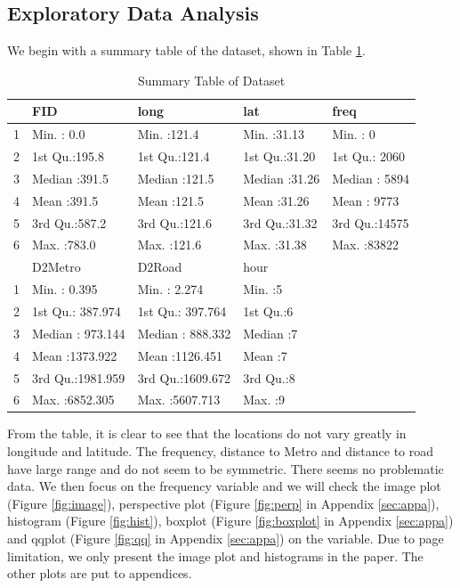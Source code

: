 \documentclass[hidelinks,12pt]{article}
\begin{document}
	\subsection{Exploratory Data Analysis}\label{sec:reseda}
	We begin with a summary table of the dataset, shown in Table \ref{tbl:sumdata}.
	\begin{table}[ht]
		\centering
		\caption{Summary Table of Dataset \label{tbl:sumdata}}
		\begin{tabular}{rllll}
			\hline
			&      FID &      long &      lat &      freq  \\ 
			\hline
			1 & Min.   :  0.0   & Min.   :121.4   & Min.   :31.13   & Min.   :    0     \\ 
			2 & 1st Qu.:195.8   & 1st Qu.:121.4   & 1st Qu.:31.20   & 1st Qu.: 2060     \\ 
			3 & Median :391.5   & Median :121.5   & Median :31.26   & Median : 5894    \\ 
			4 & Mean   :391.5   & Mean   :121.5   & Mean   :31.26   & Mean   : 9773      \\ 
			5 & 3rd Qu.:587.2   & 3rd Qu.:121.6   & 3rd Qu.:31.32   & 3rd Qu.:14575    \\ 
			6 & Max.   :783.0   & Max.   :121.6   & Max.   :31.38   & Max.   :83822      \\ 
			\hline
			 &    D2Metro &     D2Road &      hour &\\
			\hline
			1  & Min.   :   0.395 & Min.   :   2.274   & Min.   :5 &\\
			2    & 1st Qu.: 387.974  & 1st Qu.: 397.764   & 1st Qu.:6 & \\
			3   & Median : 973.144  & Median : 888.332   & Median :7 &\\
			4  & Mean   :1373.922 & Mean   :1126.451   & Mean   :7 &\\
			5   & 3rd Qu.:1981.959 & 3rd Qu.:1609.672   & 3rd Qu.:8  &\\
			6   & Max.   :6852.305 & Max.   :5607.713   & Max.   :9 & \\
			\hline
		\end{tabular}
	\end{table}
	From the table, it is clear to see that the locations do not vary greatly in longitude and latitude. The frequency, distance to Metro and distance to road have large range and do not seem to be symmetric. There seems no problematic data. We then focus on the frequency variable and we will check the image plot (Figure \ref{fig:image}), perspective plot (Figure \ref{fig:perp} in Appendix \ref{sec:appa}), histogram (Figure \ref{fig:hist}), boxplot (Figure \ref{fig:boxplot} in Appendix \ref{sec:appa}) and qqplot (Figure \ref{fig:qq} in Appendix \ref{sec:appa}) on the variable. Due to page limitation, we only present the image plot and histograms in the paper. The other plots are put to appendices.
\end{document}
